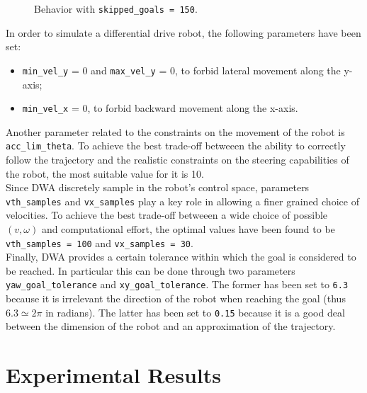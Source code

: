\documentclass[11pt,a4paper]{article}
\begin{document}
\begin{figure}[H]
{    }
    \caption[]{Behavior with \texttt{skipped\_goals = 150}.}
\end{figure}

In order to simulate a differential drive robot, the following parameters have been set:

\begin{itemize}
    \item \texttt{min\_vel\_y} = 0 and \texttt{max\_vel\_y} = 0, to forbid lateral movement along the y-axis;
    \item \texttt{min\_vel\_x} = 0, to forbid backward movement along the x-axis.\\
\end{itemize}

Another parameter related to the constraints on the movement of the robot is \texttt{acc\_lim\_theta}.
To achieve the best trade-off betweeen the ability to correctly follow the trajectory and the realistic
constraints on the steering capabilities of the robot, the most suitable value for it is 10.\\

Since DWA discretely sample in the robot's control space, parameters \texttt{vth\_samples} and \texttt{vx\_samples}
play a key role in allowing a finer grained choice of velocities.
To achieve the best trade-off betweeen a wide choice of possible $(v,\omega)$ and computational effort,
the optimal values have been found to be \texttt{vth\_samples = 100} and \texttt{vx\_samples = 30}.\\

Finally, DWA provides a certain tolerance within which the goal is considered to be reached.
In particular this can be done through two parameters \texttt{yaw\_goal\_tolerance} and \texttt{xy\_goal\_tolerance}.
The former has been set to \texttt{6.3} because it is irrelevant the direction of the robot when reaching the goal
(thus $6.3 \simeq 2\pi$ in radians).
The latter has been set to \texttt{0.15} because it is a good deal between the dimension of the robot and
an approximation of the trajectory.





\section{Experimental Results}
\end{document}
